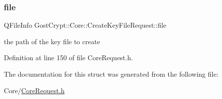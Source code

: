 \subsubsection{\texorpdfstring{file}{file}}
{\footnotesize\ttfamily Q\+File\+Info Gost\+Crypt\+::\+Core\+::\+Create\+Key\+File\+Request\+::file}

the path of the key file to create 

Definition at line 150 of file Core\+Request.\+h.



The documentation for this struct was generated from the following file\+:\begin{DoxyCompactItemize}
\item 
Core/\hyperlink{_core_request_8h}{Core\+Request.\+h}\end{DoxyCompactItemize}
